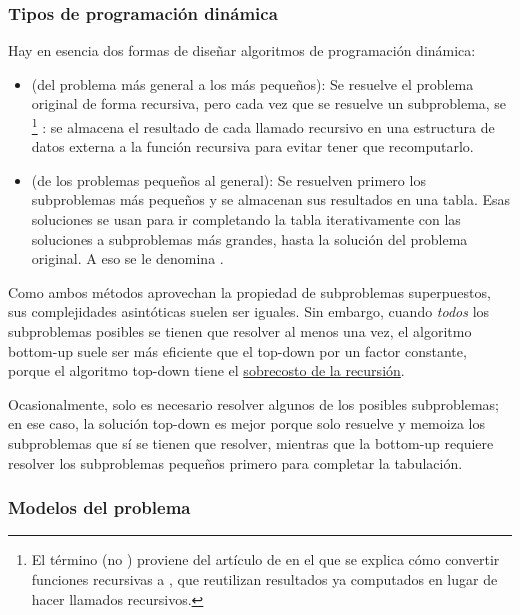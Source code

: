 \subsubsection{Tipos de programación dinámica}

Hay en esencia dos formas de diseñar algoritmos de programación dinámica: 
\begin{itemize}
    \item {} (del problema más general a los más pequeños): Se resuelve el problema original de forma recursiva, pero cada vez que se resuelve un subproblema, se %
    \footnote{El término  (no ) proviene del artículo de \textcite{michie_memo} en el que se explica cómo convertir funciones recursivas a , que reutilizan resultados ya computados en lugar de hacer llamados recursivos.}%
    : se almacena el resultado de cada llamado recursivo en una estructura de datos externa a la función recursiva para evitar tener que recomputarlo.
    \item {} (de los problemas pequeños al general): Se resuelven primero los subproblemas más pequeños y se almacenan sus resultados en una tabla. Esas soluciones se usan para ir completando la tabla iterativamente con las soluciones a subproblemas más grandes, hasta la solución del problema original. A eso se le denomina .
\end{itemize}

Como ambos métodos aprovechan la propiedad de subproblemas superpuestos, sus complejidades asintóticas suelen ser iguales. Sin embargo, cuando \textit{todos} los subproblemas posibles se tienen que resolver al menos una vez, el algoritmo bottom-up suele ser más eficiente que el top-down por un factor constante, porque el algoritmo top-down tiene el \hyperref[sec:sobrecosto_recursion]{sobrecosto de la recursión}.

Ocasionalmente, solo es necesario resolver algunos de los posibles subproblemas; en ese caso, la solución top-down es mejor porque solo resuelve y memoiza los subproblemas que sí se tienen que resolver, mientras que la bottom-up requiere resolver los subproblemas pequeños primero para completar la tabulación.

\subsubsection{Modelos del problema}

